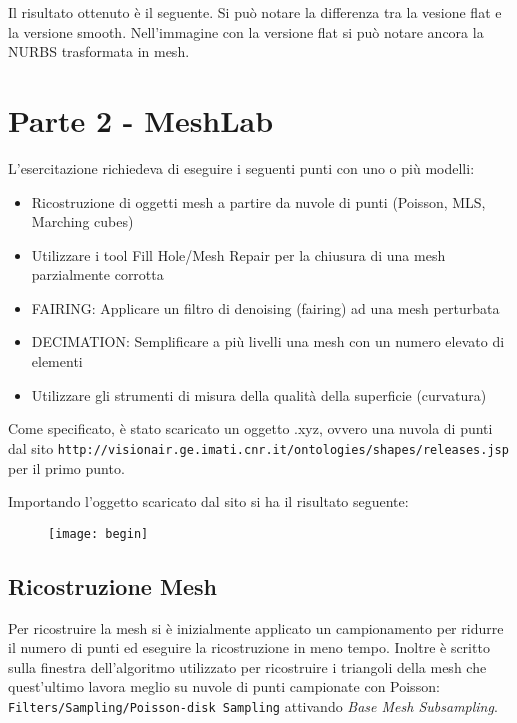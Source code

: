 \vspace{3cm}Il risultato ottenuto è il seguente. Si può notare la differenza tra la vesione flat e la versione smooth. Nell'immagine con la versione flat si può notare ancora la NURBS trasformata in mesh.\\

\begin{figure}[hbt]%
	\vspace{-1cm}
    \centering
	\vspace{-0.2cm}
\end{figure}


\newpage
\section{Parte 2 - MeshLab}
L'esercitazione richiedeva di eseguire i seguenti punti con uno o più modelli:
\begin{itemize}
  \item Ricostruzione di oggetti mesh a partire da nuvole di punti (Poisson, MLS, Marching cubes)
  \item Utilizzare i tool Fill Hole/Mesh Repair per la chiusura di una mesh parzialmente corrotta
  \item FAIRING: Applicare un filtro di denoising (fairing) ad una mesh perturbata
  \item DECIMATION: Semplificare a più livelli una mesh con un numero elevato di elementi
  \item Utilizzare gli strumenti di misura della qualità della superficie (curvatura)
\end{itemize}

Come specificato, è stato scaricato un oggetto .xyz, ovvero una nuvola di punti dal sito \texttt{http://\-visionair\-.ge\-.imati.cnr.it/\-ontologies/\-shapes/releases.jsp} per il primo punto.

Importando l'oggetto scaricato dal sito si ha il risultato seguente:
 \begin{figure}[htb]
    \centering
    \texttt{[image: begin]}
    \caption{\label{fig:begin}}
\end{figure}

\subsection{Ricostruzione Mesh}
Per ricostruire la mesh si è inizialmente applicato un campionamento per ridurre il numero di punti ed eseguire la ricostruzione in meno tempo. Inoltre è scritto sulla finestra dell'algoritmo utilizzato per ricostruire i triangoli della mesh che quest'ultimo lavora meglio su nuvole di punti campionate con Poisson: \texttt{Filters/Sampling/Poisson-disk Sampling} attivando \textit{Base Mesh Subsampling}.
\newpage

